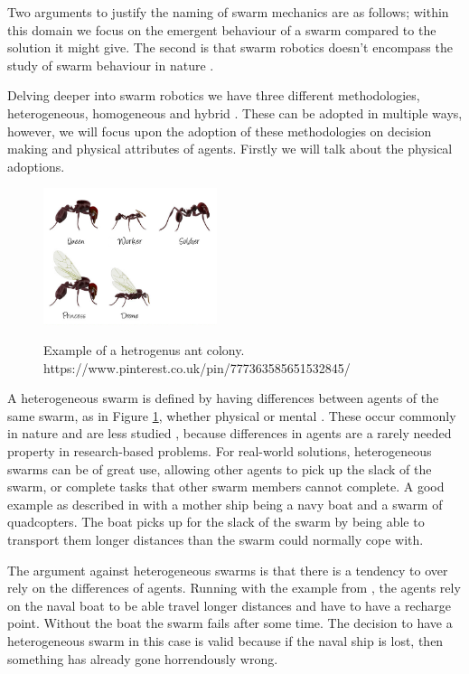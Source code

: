 \documentclass{UoYCSproject}
\begin{document}
Two arguments to justify the naming of swarm mechanics are as follows; within this domain we focus on the emergent behaviour of a swarm compared to the solution it might give. 
The second is that swarm robotics doesn’t encompass the study of swarm behaviour in nature \cite{Swarm intellegiegence, Ant communication}.

Delving deeper into swarm robotics we have three different methodologies, heterogeneous, homogeneous and hybrid \cite{Swarm robotics reviewed}. 
These can be adopted in multiple ways, however, we will focus upon the adoption of these methodologies on decision making and physical attributes of agents. 
Firstly we will talk about the physical adoptions.

\begin{figure}[htb]
\begin{center}
\label{fig:anthero}
\includegraphics[height=4cm]{"./ExplanationImgs/AntHetro.png"}
\end{center}
\caption{Example of a hetrogenus ant colony. https://www.pinterest.co.uk/pin/777363585651532845/}
\end{figure}

A heterogeneous swarm is defined by having differences between agents of the same swarm, as in Figure \ref{fig:anthero}, whether physical or mental \cite{Swarm robotics reviewed, Swarm intellegiegence}. 
These occur commonly in nature and are less studied \cite{Swarm intellegiegence}, because differences in agents are a rarely needed property in research-based problems. 
For real-world solutions, heterogeneous swarms can be of great use, allowing other agents to pick up the slack of the swarm, or complete tasks that other swarm members cannot complete. 
A good example as described in \cite{Swarm robotics reviewed} with a mother ship being a navy boat and a swarm of quadcopters. 
The boat picks up for the slack of the swarm by being able to transport them longer distances than the swarm could normally cope with.

The argument against heterogeneous swarms is that there is a tendency to over rely on the differences of agents. 
Running with the example from \cite{Swarm robotics reviewed}, the agents rely on the naval boat to be able travel longer distances and have to have a recharge point. 
Without the boat the swarm fails after some time. 
The decision to have a heterogeneous swarm in this case is valid because if the naval ship is lost, then something has already gone horrendously wrong.
\end{document}
